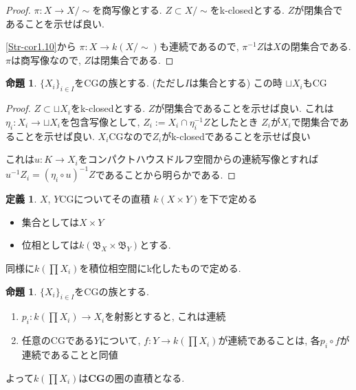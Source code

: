 \documentclass[dvipdfmx,a4paper,11pt]{article}
\theoremstyle{definition}
\newtheorem{prop}[thm]{命題}
\newtheorem{dfn}[thm]{定義}
\begin{document}
\begin{proof}
$\pi : X \to X/\sim$を商写像とする. 
$Z \subset X/\sim$をk-closedとする. $Z$が閉集合であることを示せば良い.

\ref{Str-cor1.10}から
$\pi : X \to k(X/\sim)$も連続であるので, $\pi^{-1}Z$は$X$の閉集合である.
$\pi$は商写像なので, $Z$は閉集合である. 
\end{proof}

 \begin{tcolorbox}
 [colback = white, colframe = green!35!black, fonttitle = \bfseries,breakable = true]
\begin{prop}\cite[Prop2.2]{Str}
\label{Str-prop2.2}
$\{ X_i \}_{i \in I}$をCGの族とする. (ただし$I$は集合とする)
この時
$\sqcup X_i$もCG
\end{prop}
\end{tcolorbox}
\begin{proof}
$Z \subset \sqcup X_i$をk-closedとする.
$Z$が閉集合であることを示せば良い. 
これは$\eta_i : X_i \to \sqcup X_i$を包含写像として, $Z_i := X_i \cap \eta_{i}^{-1}Z$としたとき
$Z_i$が$X_i$で閉集合であることを示せば良い.
$X_i$CGなので$Z_i$がk-closedであることを示せば良い

これは$u : K \to X_i$をコンパクトハウスドルフ空間からの連続写像とすれば
$u^{-1}Z_i = (\eta_i \circ u)^{-1}Z$であることから明らかである. 
\end{proof}


 \begin{tcolorbox}
 [colback = white, colframe = green!35!black, fonttitle = \bfseries,breakable = true]
\begin{dfn}\cite[Def 2.3]{Str}
\label{Str-def-2.3}
$X$, $Y$CGについてその直積
$k(X \times Y)$を下で定める
\begin{itemize}
\item 集合としては$X \times Y$
\item 位相としては$k(\mathfrak{B}_X \times \mathfrak{B}_Y)$とする.
\end{itemize}

同様に$k(\prod X_i)$を積位相空間にk化したもので定める. 
\end{dfn}
\end{tcolorbox}

 \begin{tcolorbox}
 [colback = white, colframe = green!35!black, fonttitle = \bfseries,breakable = true]
\begin{prop}\cite[Prop2.4]{Str}
$\{ X_i \}_{i \in I}$をCGの族とする.
\begin{enumerate}
\item $p_i : k(\prod X_i) \to X_i$を射影とすると, これは連続
\item 任意のCGである$Y$について, $f : Y \to k(\prod X_i)$が連続であることは, 各$p_i \circ f $が連続であることと同値
\end{enumerate}
よって$k(\prod X_i)$は{\bf CG}の圏の直積となる.
\end{prop}
\end{tcolorbox}
\end{document}
